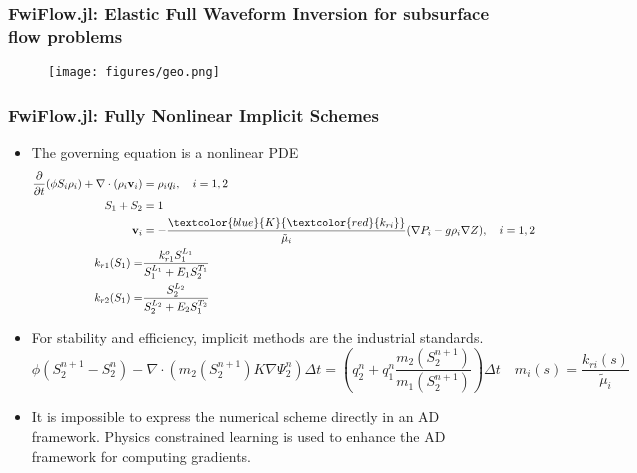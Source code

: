 \documentclass[usenames,dvipsnames]{beamer}
\begin{document}
\begin{frame}
	\frametitle{FwiFlow.jl: Elastic Full Waveform Inversion for subsurface flow problems}
	\begin{figure}[hbt]
  \texttt{[image: figures/geo.png]}
\end{figure}
\end{frame}

\begin{frame}
\frametitle{FwiFlow.jl: Fully Nonlinear Implicit Schemes}
\begin{itemize}
	\item The governing equation is a nonlinear PDE
{\scriptsize
	\begin{align*}
	\frac{\partial }{{\partial t}}(\phi {{S_i}}{\rho _i}) + \nabla  \cdot ({\rho _i}{\mathbf{v}_i}) &= {\rho _i}{q_i},\quad 
      i = 1,2	\\
      S_{1} + S_{2} &= 1\\
      {\mathbf{v}_i} &= - \frac{{\textcolor{blue}{K}{\textcolor{red}{k_{ri}}}}}{{{\tilde{\mu}_i}}}(\nabla {P_i} - g{\rho _i}\nabla Z), \quad
      i=1, 2\\
	k_{r1}(S_1) =& \frac{k_{r1}^o S_1^{L_1}}{S_1^{L_1} + E_1 S_2^{T_1}}\\
	k_{r2}(S_1) =& \frac{ S_2^{L_2}}{S_2^{L_2} + E_2 S_1^{T_2}}
	\end{align*}
	}
	\item For stability and efficiency, implicit methods are the industrial standards. 
{\scriptsize	$$\phi (S_2^{n + 1} - S_2^n) - \nabla \cdot \left( {{m_{2}}(S_2^{n + 1})K\nabla \Psi _2^n} \right) \Delta t = 
\left(q_2^n + q_1^n \frac{m_2(S^{n+1}_2)}{m_1(S^{n+1}_2)}\right) 
\Delta t\quad m_i(s) = \frac{k_{ri}(s)}{\tilde \mu_i}
$$}
\item It is impossible to express the numerical scheme directly in an AD framework. Physics constrained learning is used to enhance the AD framework for computing gradients. 
\end{itemize}

\end{frame}
\end{document}
